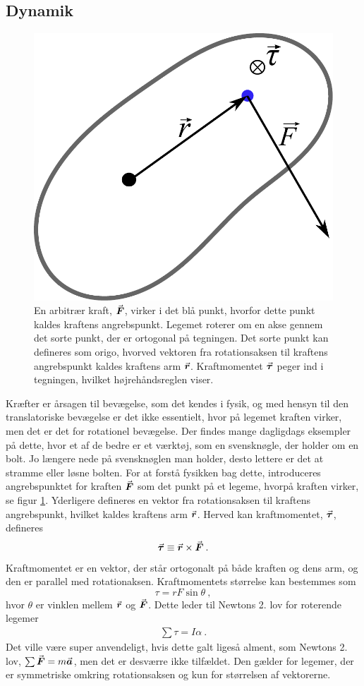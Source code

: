\subsection{Dynamik}
%
\begin{figure}[h!]
\centering
\includegraphics[width=.4\textwidth]{Analytisk-Mekanik/Kraftmoment}
\caption{En arbitrær kraft, ${\vec{\boldsymbol{F}}}$, virker i det blå punkt, hvorfor dette punkt kaldes kraftens angrebspunkt. Legemet roterer om en akse gennem det sorte punkt, der er ortogonal på tegningen. Det sorte punkt kan defineres som origo, hvorved vektoren fra rotationsaksen til kraftens angrebspunkt kaldes kraftens arm ${\vec{\boldsymbol{r}}}$. Kraftmomentet ${\vec{\boldsymbol{\tau}}}$ peger ind i tegningen, hvilket højrehåndsreglen viser.}
\label{fig:Angrebspunkt}
\end{figure}
%
Kræfter er årsagen til bevægelse, som det kendes i fysik, og med hensyn til den translatoriske bevægelse er det ikke essentielt, hvor på legemet kraften virker, men det er det for rotationel bevægelse. Der findes mange dagligdags eksempler på dette, hvor et af de bedre er et værktøj, som en svensknøgle, der holder om en bolt. Jo længere nede på svensknøglen man holder, desto lettere er det at stramme eller løsne bolten. For at forstå fysikken bag dette, introduceres angrebspunktet for kraften ${\vec{\boldsymbol{F}}}$ som det punkt på et legeme, hvorpå kraften virker, se figur \ref{fig:Angrebspunkt}. Yderligere defineres en vektor fra rotationsaksen til kraftens angrebspunkt, hvilket kaldes kraftens arm ${\vec{\boldsymbol{r}}}$. Herved kan kraftmomentet, ${\vec{\boldsymbol{\tau}}}$, defineres
%
\begin{equation} \label{eq:Kraftmoment}
    {\vec{\boldsymbol{{\tau}}}} \equiv {\vec{\boldsymbol{r}}}\times{\vec{\boldsymbol{F}}} \: .
\end{equation}
%
Kraftmomentet er en vektor, der står ortogonalt på både kraften og dens arm, og den er parallel med rotationaksen. Kraftmomentets størrelse kan bestemmes som
%
\begin{equation} \label{eq:KraftmomentNorm}
\tau = rF\sin\theta \: ,
\end{equation}
%
hvor $\theta$ er vinklen mellem ${\vec{\boldsymbol{r}}}$ og ${\vec{\boldsymbol{F}}}$. Dette leder til Newtons 2. lov for roterende legemer
\begin{align}
	\sum\tau = I\alpha \: .
\end{align}
Det ville være super anvendeligt, hvis dette galt ligeså alment, som Newtons 2. lov, $\sum{\vec{\boldsymbol{F}}} = m{\vec{\boldsymbol{a}}}$, men det er desværre ikke tilfældet. Den gælder for legemer, der er symmetriske omkring rotationsaksen og kun for størrelsen af vektorerne.


